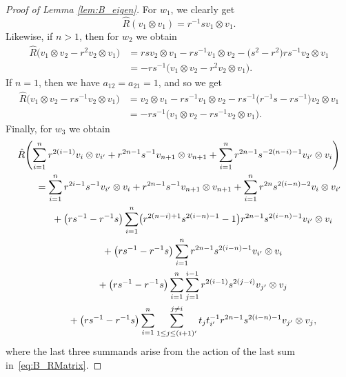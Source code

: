\documentclass[pdftex]{sigma}
\numberwithin{equation}{section}
\begin{document}
\begin{proof}[Proof of Lemma \ref{lem:B_eigen}]
For $w_{1}$, we clearly get
\begin{displaymath}
 \hat{R}(v_{1} \otimes v_{1}) = r^{-1}s v_{1} \otimes v_{1} .
\end{displaymath}
Likewise, if $n>1$, then for $w_{2}$ we obtain
\begin{align*}
 \hat{R}\bigl(v_{1} \otimes v_{2} - r^{2}v_{2} \otimes v_{1}\bigr) &{}=
 rsv_{2} \otimes v_{1} - rs^{-1}v_{1} \otimes v_{2} - \bigl(s^{2} - r^{2}\bigr)rs^{-1}v_{2} \otimes v_{1} \\
 &{}=
 -rs^{-1}\bigl(v_{1} \otimes v_{2} - r^{2}v_{2} \otimes v_{1}\bigr).
\end{align*}
If $n = 1$, then we have $a_{12} = a_{21} = 1$, and so we get
\begin{displaymath}
\begin{split}
 \hat{R}\bigl(v_{1} \otimes v_{2} - rs^{-1}v_{2} \otimes v_{1}\bigr) &{}= v_{2} \otimes v_{1} - rs^{-1}v_{1} \otimes v_{2} - rs^{-1}\bigl(r^{-1}s - rs^{-1}\bigr)v_{2} \otimes v_{1} \\
 &{}= -rs^{-1}\bigl(v_{1} \otimes v_{2} - rs^{-1}v_{2} \otimes v_{1}\bigr).
\end{split}
\end{displaymath}
Finally, for $w_{3}$ we obtain
\begin{gather*}
 \hat{R} \Biggl( \sum_{i = 1}^{n}r^{2(i - 1)}v_{i} \otimes v_{i'} +
 r^{2n -1}s^{-1}v_{n+1} \otimes v_{n+1} +
 \sum_{i = 1}^{n}r^{2n - 1}s^{-2(n - i) - 1}v_{i'} \otimes v_{i} \Biggr) \\
 \qquad{} = \sum_{i = 1}^{n} r^{2i - 1}s^{-1}v_{i'} \otimes v_{i} +
 r^{2n - 1}s^{-1}v_{n+1} \otimes v_{n+1} +
 \sum_{i = 1}^{n}r^{2n}s^{2(i - n) - 2} v_{i} \otimes v_{i'} \\
 \qquad\hphantom{=}{} + \bigl(rs^{-1} - r^{-1}s\bigr)\sum_{i = 1}^{n}\bigl(r^{2(n - i) + 1}s^{2(i - n) - 1} - 1\bigr)r^{2n - 1}s^{2(i - n) - 1} v_{i'} \otimes v_{i} \\
 \qquad\hphantom{=}{} + \bigl(rs^{-1} - r^{-1}s\bigr)\sum_{i = 1}^{n} r^{2n - 1}s^{2(i - n) - 1} v_{i'} \otimes v_{i} \\
 \qquad\hphantom{=}{} + \bigl(rs^{-1} - r^{-1}s\bigr)\sum_{i = 1}^{n}\sum_{j = 1}^{i - 1} r^{2(i - 1)}s^{2(j - i)} v_{j'} \otimes v_{j} \\
 \qquad\hphantom{=}{} + \bigl(rs^{-1} - r^{-1}s\bigr) \sum_{i = 1}^{n} \sum_{1\leq j\leq (i+1)'}^{j \neq i}
 t_{j}t_{i'}^{-1}r^{2n - 1}s^{2(i - n) - 1} v_{j'} \otimes v_{j} ,
\end{gather*}
where the last three summands arise from the action of the last sum in~\eqref{eq:B_RMatrix}.


\end{proof}
\end{document}
